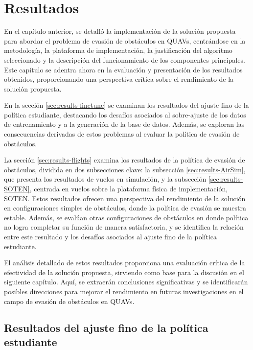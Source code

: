 \chapter{Resultados}
\label{capitulo6}

En el capítulo anterior, se detalló la implementación de la solución propuesta para abordar el problema de evasión de obstáculos en QUAVs, centrándose en la metodología, la plataforma de implementación, la justificación del algoritmo seleccionado y la descripción del funcionamiento de los componentes principales. Este capítulo se adentra ahora en la evaluación y presentación de los resultados obtenidos, proporcionando una perspectiva crítica sobre el rendimiento de la solución propuesta.

En la sección \ref{sec:results-finetune} se examinan los resultados del ajuste fino de la política estudiante, destacando los desafíos asociados al sobre-ajuste de los datos de entrenamiento y a la generación de la base de datos. Además, se exploran las consecuencias derivadas de estos problemas al evaluar la política de evasión de obstáculos.

La sección \ref{sec:results-flights} examina los resultados de la política de evasión de obstáculos, dividida en dos subsecciones clave: la subsección \ref{sec:results-AirSim}, que presenta los resultados de vuelos en simulación, y la subsección \ref{sec:results-SOTEN}, centrada en vuelos sobre la plataforma física de implementación, SOTEN. Estos resultados ofrecen una perspectiva del rendimiento de la solución en configuraciones simples de obstáculos, donde la política de evasión se muestra estable. Además, se evalúan otras configuraciones de obstáculos en donde política no logra completar su función de manera satisfactoria, y se identifica la relación entre este resultado y los desafíos asociados al ajuste fino de la política estudiante.

El análisis detallado de estos resultados proporciona una evaluación crítica de la efectividad de la solución propuesta, sirviendo como base para la discusión en el siguiente capítulo. Aquí, se extraerán conclusiones significativas y se identificarán posibles direcciones para mejorar el rendimiento en futuras investigaciones en el campo de evasión de obstáculos en QUAVs.

\section{Resultados del ajuste fino de la política estudiante}

